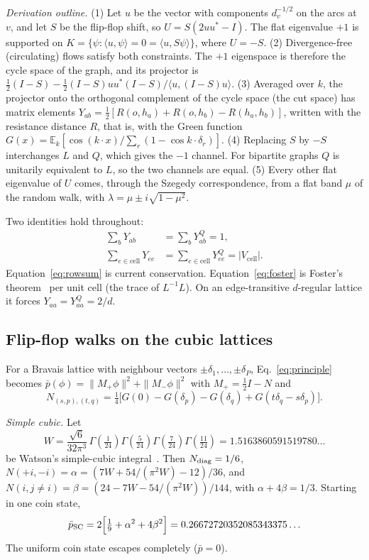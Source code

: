 \documentclass[aps,pra,10pt,twocolumn,superscriptaddress,nofootinbib]{revtex4-2}
\newcommand{\E}{\mathbb{E}}
\newcommand{\pbar}{\bar{p}}
\newcommand{\YQ}{Y^{Q}}
\begin{document}
\emph{Derivation outline.}
(1) Let $u$ be the vector with components $d_v^{-1/2}$ on the arcs at $v$, and let $S$ be the
flip-flop shift, so $U=S(2uu^{*}-I)$. The flat eigenvalue $+1$ is supported on
$K=\{\psi:\langle u,\psi\rangle=0=\langle u,S\psi\rangle\}$, where $U=-S$.
(2) Divergence-free (circulating) flows satisfy both constraints. The $+1$ eigenspace
is therefore the cycle space of the graph, and its projector is
$\tfrac12(I-S)-\tfrac12(I-S)uu^{*}(I-S)/\langle u,(I-S)u\rangle$.
(3) Averaged over $k$, the projector onto the orthogonal complement of the cycle space
(the cut space) has matrix elements $Y_{ab}=\tfrac12[R(o,h_a)+R(o,h_b)-R(h_a,h_b)]$,
written with the resistance distance $R$, that is, with the Green function
$G(x)=\E_k[\cos(k\cdot x)/\sum_r(1-\cos k\cdot\delta_r)]$.
(4) Replacing $S$ by $-S$ interchanges $L$ and $Q$, which gives the $-1$ channel.
For bipartite graphs $Q$ is unitarily equivalent to $L$, so the two channels are equal.
(5) Every other flat eigenvalue of $U$ comes, through the Szegedy correspondence,
from a flat band $\mu$ of the random walk, with $\lambda=\mu\pm i\sqrt{1-\mu^2}$.

Two identities hold throughout:
\begin{align}
\sum_{b}Y_{ab}&=\sum_b\YQ_{ab}=1, \label{eq:rowsum}\\
\sum_{e\in\text{cell}}Y_{ee}&=\sum_{e\in\text{cell}}\YQ_{ee}=|V_{\text{cell}}|.
\label{eq:foster}
\end{align}
Equation~\eqref{eq:rowsum} is current conservation. Equation~\eqref{eq:foster} is Foster's
theorem~\cite{Foster1949} per unit cell (the trace of $L^{-1}L$). On an edge-transitive
$d$-regular lattice it forces $Y_{aa}=\YQ_{aa}=2/d$.

\subsection{Flip-flop walks on the cubic lattices}

For a Bravais lattice with neighbour vectors $\pm\delta_1,\dots,\pm\delta_P$,
Eq.~\eqref{eq:principle} becomes $\pbar(\phi)=\|M_+\phi\|^2+\|M_-\phi\|^2$ with
$M_+=\tfrac12 I-N$ and
\begin{equation}
N_{(s,p),(t,q)}=\tfrac14\bigl[G(0)-G(\delta_p)-G(\delta_q)+G(t\delta_q-s\delta_p)\bigr].
\end{equation}

\emph{Simple cubic.} Let
\begin{equation}
W=\frac{\sqrt6}{32\pi^3}\,\Gamma(\tfrac1{24})\Gamma(\tfrac5{24})\Gamma(\tfrac7{24})\Gamma(\tfrac{11}{24})
=1.5163860591519780\ldots
\end{equation}
be Watson's simple-cubic integral~\cite{Watson1939,GlasserZucker1977}. Then
$N_{\rm diag}=1/6$, $N(+i,-i)=\alpha=(7W+54/(\pi^2W)-12)/36$, and
$N(i,j\ne i)=\beta=(24-7W-54/(\pi^2W))/144$, with $\alpha+4\beta=1/3$. Starting in one coin
state,
\begin{equation}
\pbar_{\rm SC}=2\Bigl[\tfrac19+\alpha^2+4\beta^2\Bigr]=0.26672720352085343375\ldots
\label{eq:sc}
\end{equation}
The uniform coin state escapes completely ($\pbar=0$).
\end{document}
